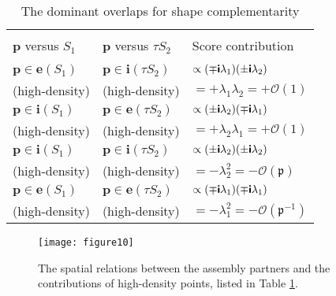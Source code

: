 \documentclass[article]{gmp2014}
\theoremstyle{definition}
\newcommand{\ii}{\text{\textsf{\textbf{i}}}}
\begin{document}
%
\begin{table}
    \caption{The dominant overlaps for shape complementarity} \label{table_1}
    \begin{tabular}{p{2.0cm} p{2.0cm} p{2.8cm}}
        \hline \\[-2ex]
        $\mathbf{p}$ {\rm versus} $S_1$ & $\mathbf{p}$ {\rm versus} $\tau S_2$ & {\rm Score contribution} \\
        \\[-2ex] \hline
        $\mathbf{p} \in \mathbf{e}(S_1)$ & $\mathbf{p} \in \mathbf{i}(\tau S_2)$ & $\propto (\mp \ii\lambda_1) (\pm \ii\lambda_2)$ \\
        (high-density) & (high-density) & $= +\lambda_1 \lambda_2 = +\mathcal{O}(1)$ \\
        \hline
        $\mathbf{p} \in \mathbf{i}(S_1)$ & $\mathbf{p} \in \mathbf{e}(\tau S_2)$ & $\propto (\pm \ii\lambda_2) (\mp \ii\lambda_1)$ \\
        (high-density) & (high-density) & $= +\lambda_2 \lambda_1 = +\mathcal{O}(1)$ \\
        \hline
        $\mathbf{p} \in \mathbf{i}(S_1)$ & $\mathbf{p} \in \mathbf{i}(\tau S_2)$ & $\propto (\pm \ii\lambda_2) (\pm \ii\lambda_2)$ \\
        (high-density) & (high-density) & $= -\lambda_2^2 = -\mathcal{O}(\mathfrak{p})$ \\
        \hline
        $\mathbf{p} \in \mathbf{e}(S_1)$ & $\mathbf{p} \in \mathbf{e}(\tau S_2)$ & $\propto (\mp \ii\lambda_1) (\mp \ii\lambda_1)$ \\
        (high-density) & (high-density) & $= -\lambda_1^2 = -\mathcal{O}(\mathfrak{p}^{-1})$ \\
        \hline
    \end{tabular}
\end{table}
%

%
\begin{figure}
    \centering
    \texttt{[image: figure10]}
    \caption{The spatial relations between the assembly partners and the contributions of high-density points, listed in Table \ref{table_1}.} \label{figure10}
\end{figure}
%
\end{document}
